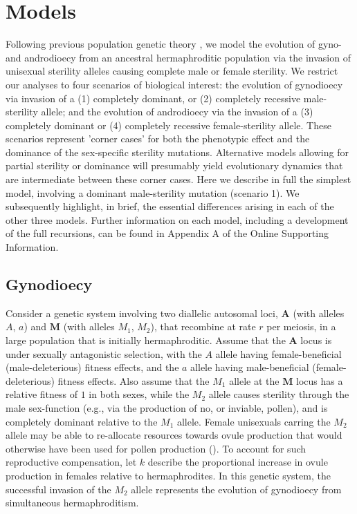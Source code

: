 \documentclass[9pt,twocolumn,twoside,lineno]{gsajnl}
\begin{document}
\section{Models} \label{sec:methods}

Following previous population genetic theory \citep{Charlesworth1978a}, we model the evolution of gyno- and androdioecy from an ancestral hermaphroditic population via the invasion of unisexual sterility alleles causing complete male or female sterility. We restrict our analyses to four scenarios of biological interest: the evolution of gynodioecy via invasion of a (1) completely dominant, or (2) completely recessive male-sterility allele; and the evolution of androdioecy via the invasion of a (3) completely dominant or (4) completely recessive female-sterility allele. These scenarios represent 'corner cases' for both the phenotypic effect and the dominance of the sex-specific sterility mutations. Alternative models allowing for partial sterility or dominance will presumably yield evolutionary dynamics that are intermediate between these corner cases. Here we describe in full the simplest model, involving a dominant male-sterility mutation (scenario 1). We subsequently highlight, in brief, the essential differences arising in each of the other three models. Further information on each model, including a development of the full recursions, can be found in Appendix A of the Online Supporting Information. 

\subsection{Gynodioecy}

Consider a genetic system involving two diallelic autosomal loci, $\mathbf{A}$ (with alleles $A$, $a$) and $\mathbf{M}$ (with alleles $M_1$, $M_2$), that recombine at rate $r$ per meiosis, in a large population that is initially hermaphroditic. Assume that the $\mathbf{A}$ locus is under sexually antagonistic selection, with the $A$ allele having female-beneficial (male-deleterious) fitness effects, and the $a$ allele having male-beneficial (female-deleterious) fitness effects. Also assume that the $M_1$ allele at the $\mathbf{M}$ locus has a relative fitness of $1$ in both sexes, while the $M_2$ allele causes sterility through the male sex-function (e.g., via the production of no, or inviable, pollen), and is completely dominant relative to the $M_1$ allele. Female unisexuals carring the $M_2$ allele may be able to re-allocate resources towards ovule production that would otherwise have been used for pollen production (\citealt{Lloyd1975,Lloyd1976,Charlesworth1978a}). To account for such reproductive compensation, let $k$ describe the proportional increase in ovule production in females relative to hermaphrodites. In this genetic system, the successful invasion of the $M_2$ allele represents the evolution of gynodioecy from simultaneous hermaphroditism. 
\end{document}
